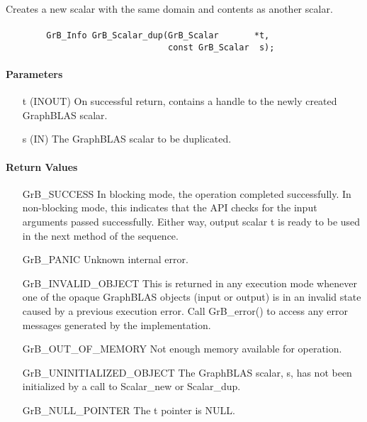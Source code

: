 Creates a new scalar with the same domain and contents as another scalar.

\paragraph{\syntax}

\begin{verbatim}
        GrB_Info GrB_Scalar_dup(GrB_Scalar       *t,
                                const GrB_Scalar  s);
\end{verbatim}

\paragraph{Parameters}

\begin{itemize}[leftmargin=1.1in]
    \item[{\sf t}]  ({\sf INOUT}) On successful return, contains a handle
                                  to the newly created GraphBLAS scalar.
    \item[{\sf s}]  ({\sf IN})    The GraphBLAS scalar to be duplicated.
\end{itemize}

\paragraph{Return Values}

\begin{itemize}[leftmargin=2.1in]
    \item[{\sf GrB\_SUCCESS}]         In blocking mode, the operation completed
    successfully. In non-blocking mode, this indicates that the API checks 
    for the input arguments passed successfully. Either way, output scalar 
    {\sf t} is ready to be used in the next method of the sequence.

    \item[{\sf GrB\_PANIC}]           Unknown internal error.
    
    \item[{\sf GrB\_INVALID\_OBJECT}] This is returned in any execution mode 
    whenever one of the opaque GraphBLAS objects (input or output) is in an invalid 
    state caused by a previous execution error.  Call {\sf GrB\_error()} to access 
    any error messages generated by the implementation.

    \item[{\sf GrB\_OUT\_OF\_MEMORY}] Not enough memory available for operation.
    
    \item[{\sf GrB\_UNINITIALIZED\_OBJECT}]  The GraphBLAS scalar, {\sf s}, has 
    not been initialized by a call to {\sf Scalar\_new} or {\sf Scalar\_dup}.
    
    \item[{\sf GrB\_NULL\_POINTER}]  The {\sf t} pointer is {\sf NULL}.
\end{itemize}

